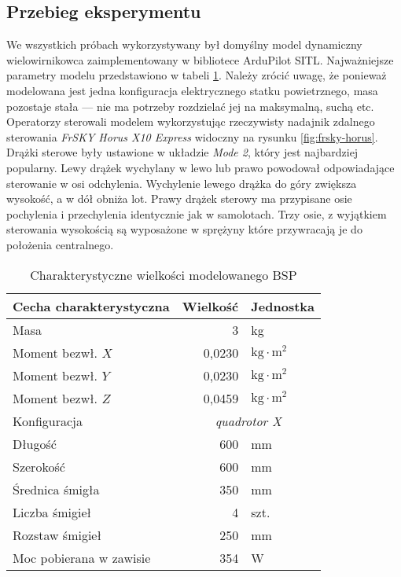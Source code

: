 \subsection{Przebieg eksperymentu}
We wszystkich próbach wykorzystywany był domyślny model dynamiczny wielowirnikowca zaimplementowany w bibliotece ArduPilot SITL\cite{sitl-model}. Najważniejsze parametry modelu przedstawiono w tabeli \ref{tab:sitl-model}. Należy zrócić uwagę, że ponieważ modelowana jest jedna konfiguracja elektrycznego statku powietrznego, masa pozostaje stała --- nie ma potrzeby rozdzielać jej na maksymalną, suchą etc. Operatorzy sterowali modelem wykorzystując rzeczywisty nadajnik zdalnego sterowania \emph{FrSKY Horus X10 Express} widoczny na rysunku \ref{fig:frsky-horus}. Drążki sterowe były ustawione w układzie \emph{Mode 2}, który jest najbardziej popularny\cite{mcnabb2021}. Lewy drążek wychylany w lewo lub prawo powodował odpowiadające sterowanie w osi odchylenia. Wychylenie lewego drążka do góry zwiększa wysokość, a w dół obniża lot. Prawy drążek sterowy ma przypisane osie pochylenia i przechylenia identycznie jak w samolotach. Trzy osie, z wyjątkiem sterowania wysokością są wyposażone w sprężyny które przywracają je do położenia centralnego.
\begin{table}[!h] \centering
    \caption{Charakterystyczne wielkości modelowanego BSP}
    \label{tab:sitl-model}

    \begin{tabular}{|l | r|l |}
    \hline
    Cecha charakterystyczna & Wielkość & Jednostka \\ \hline \hline
    Masa & 3 & kg \\ \hline
    Moment bezwł. $ X $ & 0,0230 & $ \text{kg}\cdot\text{m}^2 $ \\ \hline
    Moment bezwł. $ Y $ & 0,0230 & $ \text{kg}\cdot\text{m}^2 $ \\ \hline
    Moment bezwł. $ Z $ & 0,0459 & $ \text{kg}\cdot\text{m}^2 $ \\ \hline
    Konfiguracja & \multicolumn{2}{c|}{\emph{quadrotor X}} \\ \hline
    Długość & 600 & mm \\ \hline
    Szerokość & 600 & mm \\ \hline
    Średnica śmigła & 350 & mm \\ \hline
    Liczba śmigieł & 4 & szt. \\ \hline
    Rozstaw śmigieł & 250 & mm \\ \hline
    Moc pobierana w zawisie & 354 & W \\ \hline
  \end{tabular}
\end{table}

